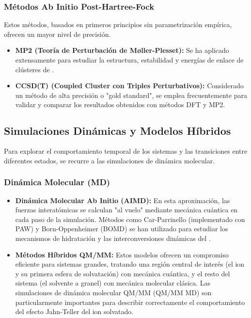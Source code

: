 \subsubsection{Métodos Ab Initio Post-Hartree-Fock}
Estos métodos, basados en primeros principios sin parametrización empírica, ofrecen un mayor nivel de precisión.
\begin{itemize}
    \item \textbf{MP2 (Teoría de Perturbación de Møller-Plesset):} Se ha aplicado extensamente para estudiar la estructura, estabilidad y energías de enlace de clústeres de .
    \item \textbf{CCSD(T) (Coupled Cluster con Triples Perturbativos):} Considerado un método de alta precisión o "gold standard", se emplea frecuentemente para validar y comparar los resultados obtenidos con métodos DFT y MP2.
\end{itemize}

\subsection{Simulaciones Dinámicas y Modelos Híbridos}
Para explorar el comportamiento temporal de los sistemas y las transiciones entre diferentes estados, se recurre a las simulaciones de dinámica molecular.

\subsubsection{Dinámica Molecular (MD)}
\begin{itemize}
    \item \textbf{Dinámica Molecular Ab Initio (AIMD):} En esta aproximación, las fuerzas interatómicas se calculan "al vuelo" mediante mecánica cuántica en cada paso de la simulación. Métodos como Car-Parrinello (implementado con PAW) y Born-Oppenheimer (BOMD) se han utilizado para estudiar los mecanismos de hidratación y las interconversiones dinámicas del .
    \item \textbf{Métodos Híbridos QM/MM:} Estos modelos ofrecen un compromiso eficiente para sistemas grandes, tratando una región central de interés (el ion y su primera esfera de solvatación) con mecánica cuántica, y el resto del sistema (el solvente a granel) con mecánica molecular clásica. Las simulaciones de dinámica molecular QM/MM (QM/MM MD) son particularmente importantes para describir correctamente el comportamiento del efecto Jahn-Teller del ion  solvatado.
\end{itemize}

